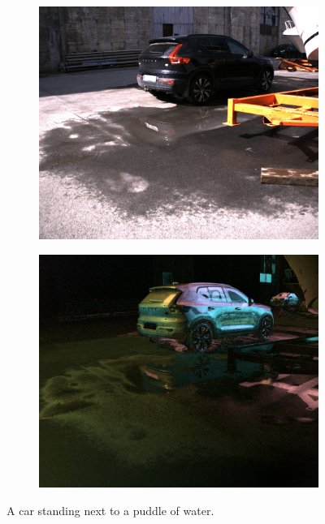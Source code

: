 \begin{figure}[H]
    \begin{subfigure}[T]{.49\textwidth}
        \includegraphics[width=\textwidth]{figures/pictures/img_1116_s0.jpg}
    \end{subfigure} \hfill
    \begin{subfigure}[T]{.49\textwidth}
        \includegraphics[width=\textwidth]{figures/pictures/img_1116_pol.jpg}
    \end{subfigure}
    \caption{A car standing next to a puddle of water.}
\end{figure}
\vspace{-.5cm}

